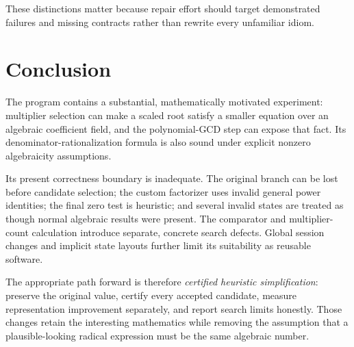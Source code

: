 \documentclass[11pt,letterpaper]{article}
\theoremstyle{definition}
\theoremstyle{remark}
\begin{document}
These distinctions matter because repair effort should target demonstrated
failures and missing contracts rather than rewrite every unfamiliar idiom.

\section{Conclusion}
The program contains a substantial, mathematically motivated experiment:
multiplier selection can make a scaled root satisfy a smaller equation over
an algebraic coefficient field, and the polynomial-GCD step can expose that
fact. Its denominator-rationalization formula is also sound under explicit
nonzero algebraicity assumptions.

Its present correctness boundary is inadequate. The original branch can be
lost before candidate selection; the custom factorizer uses invalid general
power identities; the final zero test is heuristic; and several invalid
states are treated as though normal algebraic results were present. The
comparator and multiplier-count calculation introduce separate, concrete
search defects. Global session changes and implicit state layouts further
limit its suitability as reusable software.

The appropriate path forward is therefore \emph{certified heuristic
simplification}: preserve the original value, certify every accepted
candidate, measure representation improvement separately, and report search
limits honestly. Those changes retain the interesting mathematics while
removing the assumption that a plausible-looking radical expression must be
the same algebraic number.

\clearpage
\appendix
\end{document}
